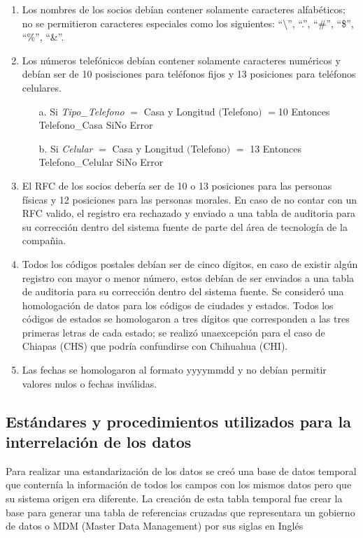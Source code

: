 \documentclass[a4paper,openright,12pt]{book}
\begin{document}
\begin{enumerate}
\item Los nombres de los socios debían contener solamente caracteres
  alfabéticos; no se permitieron caracteres especiales como los siguientes:
  ``\textbackslash'', ``.'', ``\#'', ``\$'', ``\%'', ``\&''.
\item Los números telefónicos debían contener solamente caracteres numéricos y debían ser de 10 posisciones para teléfonos fijos y 13 posiciones para teléfonos celulares.
\begin{itemize}
\item[a.] Si \textit{Tipo\_Telefono}  $=$ Casa y Longitud $($Telefono$)$  $=$10 Entonces Telefono\_Casa SiNo Error
\item[b.] Si \textit{Celular} $=$ Casa y Longitud $($Telefono$)$ $=$ 13 Entonces Telefono\_Celular SiNo Error
\end{itemize}  
\item El RFC de los socios debería ser de 10 o 13 posiciones para las personas físicas y 12 posiciones para las personas morales. En caso de no contar con un RFC valido, el registro era rechazado y enviado a una tabla de auditoria para su corrección dentro del sistema fuente de parte del área de tecnología de la compañia. 
\item Todos los códigos postales debían ser de cinco dígitos, en caso de existir algún registro con mayor o menor número, estos debían de ser enviados a una tabla de auditoria para su corrección dentro del sistema fuente. Se consideró una homologación de datos para los códigos de ciudades y estados. Todos los códigos de estados se homologaron a tres dígitos que corresponden a las tres primeras letras de cada estado; se realizó unaexcepción para el caso de Chiapas (CHS) que podría confundirse con Chihuahua (CHI).
\item Las fechas se homologaron al formato yyyymmdd y no debían permitir valores nulos o fechas inválidas.
\end{enumerate}
\subsection{Estándares y procedimientos utilizados para la interrelación de los datos}
Para realizar una estandarización de los datos se creó una base de datos temporal que conternía la información de todos los campos con los mismos datos pero que su sistema origen era diferente. La creación de esta tabla temporal fue crear la base para generar una tabla de referencias cruzadas que representara un gobierno de datos o MDM (Master Data Management) por sus siglas en Inglés
\end{document}
